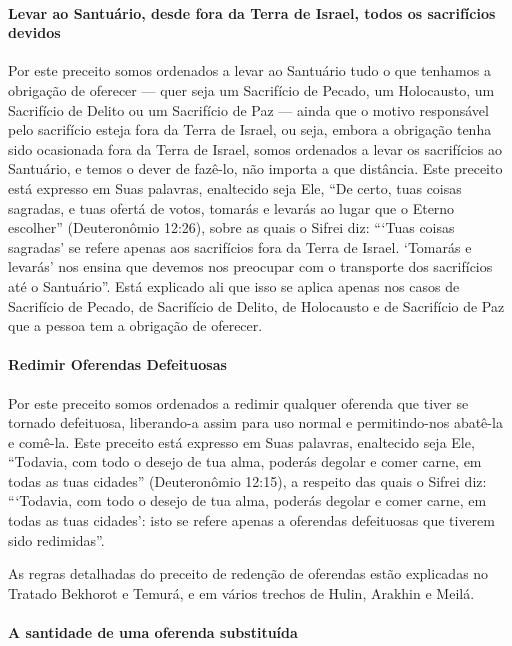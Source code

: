 \paragraph{Levar ao Santuário, desde fora da Terra de Israel, todos os sacrifícios devidos}

Por este preceito somos ordenados a levar ao Santuário tudo o que
tenhamos a obrigação de oferecer --- quer seja um Sacrifício de Pecado,
um Holocausto, um Sacrifício de Delito ou um Sacrifício de Paz --- ainda
que o motivo responsável pelo sacrifício esteja fora da Terra de
Israel, ou seja, embora a obrigação tenha sido ocasionada fora da Terra
de Israel, somos ordenados a levar os sacrifícios ao Santuário, e temos
o dever de fazê-lo, não importa a que distância. Este preceito está
expresso em Suas palavras, enaltecido seja Ele, ``De certo, tuas coisas
sagradas, e tuas ofertá de votos, tomarás e levarás ao lugar que o
Eterno escolher'' (Deuteronômio 12:26), sobre as quais o Sifrei diz:
```Tuas coisas sagradas' se refere apenas aos sacrifícios fora da Terra
de Israel. `Tomarás e levarás' nos ensina que devemos nos preocupar com
o transporte dos sacrifícios até o Santuário''. Está explicado ali que
isso se aplica apenas nos casos de Sacrifício de Pecado, de Sacrifício
de Delito, de Holocausto e de Sacrifício de Paz que a pessoa tem a
obrigação de oferecer.

\paragraph{Redimir Oferendas Defeituosas}

Por este preceito somos ordenados a redimir qualquer oferenda que tiver
se tornado defeituosa, liberando-a assim para uso normal e
permitindo-nos abatê-la e comê-la. Este preceito está expresso em Suas
palavras, enaltecido seja Ele, ``Todavia, com todo o desejo de tua alma,
poderás degolar e comer carne, em todas as tuas cidades'' (Deuteronômio
12:15), a respeito das quais o Sifrei diz: ```Todavia, com todo o desejo
de tua alma, poderás degolar e comer carne, em todas as tuas cidades':
isto se refere apenas a oferendas defeituosas que tiverem sido
redimidas''.

As regras detalhadas do preceito de redenção de oferendas estão
explicadas no Tratado Bekhorot e Temurá, e em vários trechos de Hulin,
Arakhin e Meilá.

\paragraph{A santidade de uma oferenda substituída}

